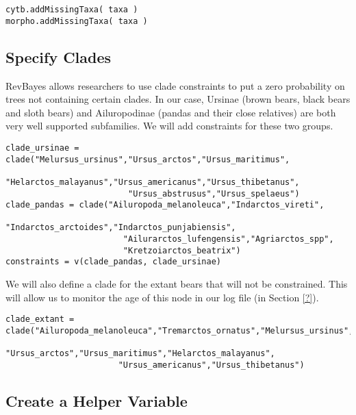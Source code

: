 {\tt \begin{snugshade*}
\begin{lstlisting}
cytb.addMissingTaxa( taxa )
morpho.addMissingTaxa( taxa )
\end{lstlisting}
\end{snugshade*}}


\bigskip

\subsection{Specify Clades}

RevBayes allows researchers to use clade constraints to put a zero probability on trees not containing certain clades. In our case, Ursinae (brown bears, black bears and sloth bears) and Ailuropodinae (pandas and their close relatives) are both very well supported subfamilies. We will add constraints for these two groups. 

{\tt \begin{snugshade*}
\begin{lstlisting}
clade_ursinae = clade("Melursus_ursinus","Ursus_arctos","Ursus_maritimus", 
                         "Helarctos_malayanus","Ursus_americanus","Ursus_thibetanus", 
                         "Ursus_abstrusus","Ursus_spelaeus")
clade_pandas = clade("Ailuropoda_melanoleuca","Indarctos_vireti",
                        "Indarctos_arctoides","Indarctos_punjabiensis", 
                        "Ailurarctos_lufengensis","Agriarctos_spp",
                        "Kretzoiarctos_beatrix")
constraints = v(clade_pandas, clade_ursinae)
\end{lstlisting}
\end{snugshade*}}

We will also define a clade for the extant bears that will not be constrained. This will allow us to monitor the age of this node in our log file (in Section \ref{?}).
{\tt \begin{snugshade*}
\begin{lstlisting}
clade_extant = clade("Ailuropoda_melanoleuca","Tremarctos_ornatus","Melursus_ursinus",
                       "Ursus_arctos","Ursus_maritimus","Helarctos_malayanus",
                       "Ursus_americanus","Ursus_thibetanus")
\end{lstlisting}
\end{snugshade*}}

\bigskip

\subsection{Create a Helper Variable}

